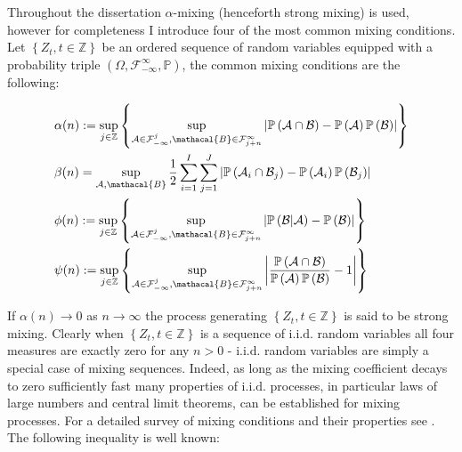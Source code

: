 \documentclass[11pt]{report}\usepackage[utf8]{inputenc}
\begin{document}
Throughout the dissertation $\alpha$-mixing (henceforth strong mixing) is used, however for completeness I introduce four of the most common mixing conditions. Let $\left \{ Z_t, t \in \mathbb{Z} \right \}$ be an ordered sequence of random variables equipped with a probability triple $\left ( \Omega, \mathcal{F}_{-\infty}^\infty, \mathbb{P} \right )$, the common mixing conditions are the following: 

\begin{align*} \label{mixing condition}
    & \alpha(n) := \sup_{j \in \mathbb{Z}} \left \{ \sup_{\mathcal{A} \in \mathcal{F}_{- \infty}^j,\mathacal{B} \in \mathcal{F}_{j+n}^\infty} \left | \mathbb{P}\left ( \mathcal{A} \cap \mathcal{B}\right ) - \mathbb{P}\left ( \mathcal{A}\right )\mathbb{P}\left (  \mathcal{B}\right ) \right |  \right \} \\
    & \beta(n) = \sup_{\mathcal{A},\mathacal{B}} \frac{1}{2} \sum_{i=1}^{I} \sum_{j=1}^{J} \left | \mathbb{P}\left ( \mathcal{A}_i \cap \mathcal{B}_j\right ) - \mathbb{P}\left ( \mathcal{A}_i\right )\mathbb{P}\left ( \mathcal{B}_j \right ) \right | \nonumber \\
    & \phi(n) := \sup_{j \in \mathbb{Z}} \left \{ \sup_{\mathcal{A} \in \mathcal{F}_{- \infty}^j,\mathacal{B} \in \mathcal{F}_{j+n}^\infty} \left | \mathbb{P}\left ( \mathcal{B} | \mathcal{A} \right ) - \mathbb{P}\left (  \mathcal{B}\right )\right | \right \} \nonumber \\
    & \psi(n) := \sup_{j \in \mathbb{Z}} \left \{  \sup_{\mathcal{A} \in \mathcal{F}_{- \infty}^j,\mathacal{B} \in \mathcal{F}_{j+n}^\infty} \left | \frac{\mathbb{P}\left ( \mathcal{A} \cap \mathcal{B}\right )}{\mathbb{P}\left ( \mathcal{A}\right )\mathbb{P}\left (  \mathcal{B}\right )} - 1 \right | \right \} \nonumber
\end{align*}

If $\alpha(n) \rightarrow 0$ as $n \rightarrow \infty$ the process generating $\left \{ Z_t, t \in \mathbb{Z} \right \}$ is said to be strong mixing. Clearly when $\left \{ Z_t, t \in \mathbb{Z} \right \}$ is a sequence of $\text{i.i.d.}$ random variables all four measures are exactly zero for any $n>0$ - $\text{i.i.d.}$ random variables are simply a special case of mixing sequences. Indeed, as long as the mixing coefficient decays to zero sufficiently fast many properties of $\text{i.i.d.}$ processes, in particular laws of large numbers and central limit theorems, can be established for mixing processes. For a detailed survey of mixing conditions and their properties see \cite{bradley2005basic}. The following inequality is well known:
\end{document}

